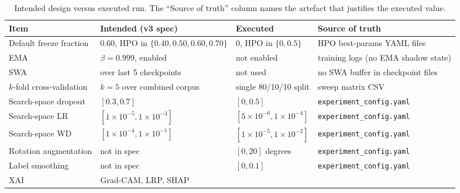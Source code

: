 \documentclass[../preamble.tex]{subfiles}
\begin{document}
\begin{table}[htbp]
  \centering
  \small
  \caption{Intended design versus executed run. The ``Source of truth'' column
           names the artefact that justifies the executed value.}
  \label{tab:intended-vs-executed}
  \begin{tabularx}{\linewidth}{@{}lXXX@{}}
    \toprule
    \textbf{Item} & \textbf{Intended (v3 spec)} & \textbf{Executed} & \textbf{Source of truth} \\
    \midrule
    Default freeze fraction       & $0.60$, HPO in $\{0.40,0.50,0.60,0.70\}$
                                   & $0$, HPO in $\{0, 0.5\}$
                                   & HPO best-params YAML files \\
    EMA                           & $\beta = 0.999$, enabled
                                   & not enabled
                                   & training logs (no EMA shadow state) \\
    SWA                           & over last 5 checkpoints
                                   & not used
                                   & no SWA buffer in checkpoint files \\
    $k$-fold cross-validation     & $k = 5$ over combined corpus
                                   & single 80/10/10 split
                                   & sweep matrix CSV \\
    Search-space dropout          & $[0.3, 0.7]$
                                   & $[0, 0.5]$
                                   & \texttt{experiment\_config.yaml} \\
    Search-space LR               & $[1 \times 10^{-5}, 1 \times 10^{-3}]$
                                   & $[5 \times 10^{-6}, 1 \times 10^{-4}]$
                                   & \texttt{experiment\_config.yaml} \\
    Search-space WD               & $[1 \times 10^{-4}, 1 \times 10^{-1}]$
                                   & $[1 \times 10^{-5}, 1 \times 10^{-2}]$
                                   & \texttt{experiment\_config.yaml} \\
    Rotation augmentation        & not in spec
                                   & $[0, 20]$ degrees
                                   & \texttt{experiment\_config.yaml} \\
    Label smoothing              & not in spec
                                   & $[0, 0.1]$
                                   & \texttt{experiment\_config.yaml} \\
    XAI                           & Grad-CAM, LRP, SHAP

\end{tabularx}
\end{table}
\end{document}
